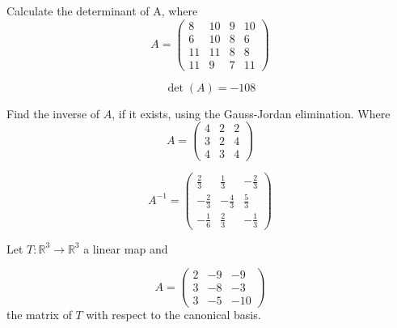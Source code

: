 \begin{questions}

\question Calculate the determinant of A, where
$$
A=\left(\begin{array}{rrrr}
8 & 10 & 9 & 10 \\
6 & 10 & 8 & 6 \\
11 & 11 & 8 & 8 \\
11 & 9 & 7 & 11
\end{array}\right)
$$

\begin{solution}
$$\det(A)=-108$$
\end{solution}

\question Find the inverse of $A$, if it exists, using the Gauss-Jordan elimination. Where
$$
A=\left(\begin{array}{rrr}
4 & 2 & 2 \\
3 & 2 & 4 \\
4 & 3 & 4
\end{array}\right)
$$

\begin{solution}
$$A^{-1}=\left(\begin{array}{rrr}
\frac{2}{3} & \frac{1}{3} & -\frac{2}{3} \\
-\frac{2}{3} & -\frac{4}{3} & \frac{5}{3} \\
-\frac{1}{6} & \frac{2}{3} & -\frac{1}{3}
\end{array}\right)$$
\end{solution}

\question Let $T:\mathbb{R}^3\rightarrow\mathbb{R}^3$  a linear map and
 
$$
A=\left(\begin{array}{rrr}
2 & -9 & -9 \\
3 & -8 & -3 \\
3 & -5 & -10
\end{array}\right)
$$
the matrix of $T$ with respect to the canonical basis.
\end{questions}
